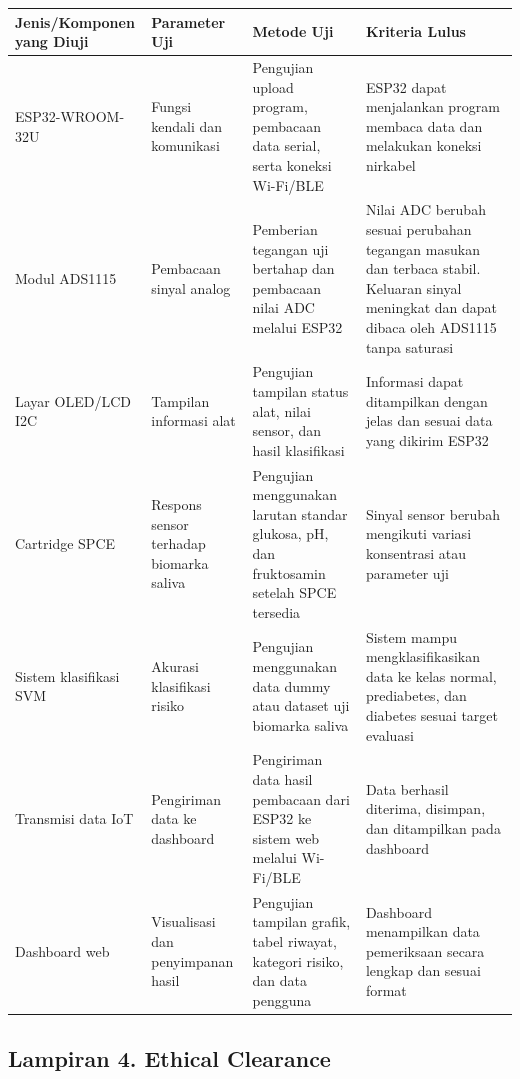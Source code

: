 \documentclass[12pt,a4paper]{article}
\begin{document}
\begin{table}[htbp]
\centering
\begin{tabularx}{\textwidth}{|X|X|X|X|}
\hline
\textbf{Jenis/Komponen yang Diuji} & \textbf{Parameter Uji} & \textbf{Metode Uji} & \textbf{Kriteria Lulus} \\ \hline
ESP32-WROOM-32U & Fungsi kendali dan komunikasi & Pengujian upload program, pembacaan data serial, serta koneksi Wi-Fi/BLE & ESP32 dapat menjalankan program membaca data dan melakukan koneksi nirkabel \\ \hline
Modul ADS1115 & Pembacaan sinyal analog & Pemberian tegangan uji bertahap dan pembacaan nilai ADC melalui ESP32 & Nilai ADC berubah sesuai perubahan tegangan masukan dan terbaca stabil. Keluaran sinyal meningkat dan dapat dibaca oleh ADS1115 tanpa saturasi \\ \hline
Layar OLED/LCD I2C & Tampilan informasi alat & Pengujian tampilan status alat, nilai sensor, dan hasil klasifikasi & Informasi dapat ditampilkan dengan jelas dan sesuai data yang dikirim ESP32 \\ \hline
Cartridge SPCE & Respons sensor terhadap biomarka saliva & Pengujian menggunakan larutan standar glukosa, pH, dan fruktosamin setelah SPCE tersedia & Sinyal sensor berubah mengikuti variasi konsentrasi atau parameter uji \\ \hline
Sistem klasifikasi SVM & Akurasi klasifikasi risiko & Pengujian menggunakan data dummy atau dataset uji biomarka saliva & Sistem mampu mengklasifikasikan data ke kelas normal, prediabetes, dan diabetes sesuai target evaluasi \\ \hline
Transmisi data IoT & Pengiriman data ke dashboard & Pengiriman data hasil pembacaan dari ESP32 ke sistem web melalui Wi-Fi/BLE & Data berhasil diterima, disimpan, dan ditampilkan pada dashboard \\ \hline
Dashboard web & Visualisasi dan penyimpanan hasil & Pengujian tampilan grafik, tabel riwayat, kategori risiko, dan data pengguna & Dashboard menampilkan data pemeriksaan secara lengkap dan sesuai format \\ \hline
\end{tabularx}
\end{table}

\subsection*{Lampiran 4. Ethical Clearance}
\end{document}
